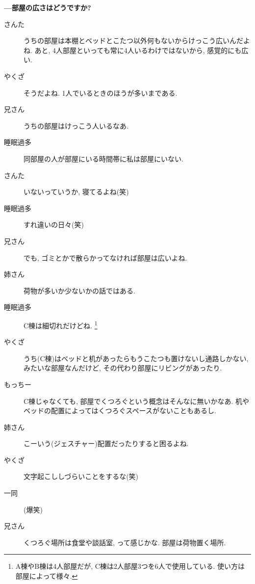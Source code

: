 \documentclass[10pt,b5jsbook,dvips,dvipdfmx,openany]{jsbook}
\theoremstyle{definition}
\begin{document}
		\textbf{---部屋の広さはどうですか? }
		\begin{description}
		\item[さんた]うちの部屋は本棚とベッドとこたつ以外何もないからけっこう広いんだよね. あと, 4人部屋といっても常に4人いるわけではないから, 感覚的にも広い.
		\item[やくざ]そうだよね. 1人でいるときのほうが多いまである.
		\item[兄さん]うちの部屋はけっこう人いるなあ.
		\item[睡眠過多]同部屋の人が部屋にいる時間帯に私は部屋にいない.
		\item[さんた]いないっていうか, 寝てるよね(笑)
		\item[睡眠過多]すれ違いの日々(笑)
		\item[兄さん]でも, ゴミとかで散らかってなければ部屋は広いよね.
		\item[姉さん]荷物が多いか少ないかの話ではある.
		\item[睡眠過多]C棟は細切れだけどね. \footnote{A棟やB棟は4人部屋だが, C棟は2人部屋3つを6人で使用している. 使い方は部屋によって様々. }
		\item[やくざ]うち(C棟)はベッドと机があったらもうこたつも置けないし通路しかない, みたいな部屋なんだけど, その代わり部屋にリビングがあったり.
		\item[もっちー]C棟じゃなくても, 部屋でくつろぐという概念はそんなに無いかなあ. 机やベッドの配置によってはくつろぐスペースがないこともあるし.
		\item[姉さん]こーいう(ジェスチャー)配置だったりすると困るよね.
		\item[やくざ]文字起こししづらいことをするな(笑)
		\item[ 一同 ](爆笑)
		\item[兄さん]くつろぐ場所は食堂や談話室, って感じかな. 部屋は荷物置く場所.
		\end{description}
\end{document}
